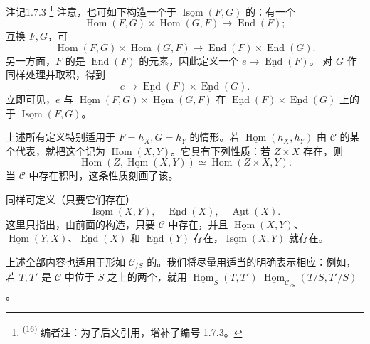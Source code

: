\begin{SGAresult}{注记}{1.7.3}
\footnote{\textsuperscript{(16)} 编者注：为了后文引用，增补了编号 1.7.3。}
注意，也可如下构造一个于 $\underline{\operatorname{Isom}}(F,G)$ 的：有一个
\[
\underline{\operatorname{Hom}}(F,G)\times\underline{\operatorname{Hom}}(G,F)\longrightarrow\underline{\operatorname{End}}(F);
\]
互换 $F,G$，可
\[
\underline{\operatorname{Hom}}(F,G)\times\underline{\operatorname{Hom}}(G,F)\longrightarrow\underline{\operatorname{End}}(F)\times\underline{\operatorname{End}}(G).
\]
另一方面，$F$ 的是 $\operatorname{End}(F)$ 的元素，因此定义一个 $e\to\underline{\operatorname{End}}(F)$。
对 $G$ 作同样处理并取积，得到
\[
e\longrightarrow\underline{\operatorname{End}}(F)\times\underline{\operatorname{End}}(G).
\]
立即可见，$e$ 与 $\underline{\operatorname{Hom}}(F,G)\times\underline{\operatorname{Hom}}(G,F)$ 在 $\underline{\operatorname{End}}(F)\times\underline{\operatorname{End}}(G)$ 上的于 $\underline{\operatorname{Isom}}(F,G)$。
\end{SGAresult}
上述所有定义特别适用于 $F=h_X,G=h_Y$ 的情形。若 $\underline{\operatorname{Hom}}(h_X,h_Y)$ 由 $\mathcal C$ 的某个代表，就把这个记为 $\underline{\operatorname{Hom}}(X,Y)$。它具有下列性质：若 $Z\times X$ 存在，则
\[
\operatorname{Hom}(Z,\underline{\operatorname{Hom}}(X,Y))\simeq\operatorname{Hom}(Z\times X,Y).
\]
当 $\mathcal C$ 中存在积时，这条性质刻画了该。

同样可定义（只要它们存在）
\[
\underline{\operatorname{Isom}}(X,Y),\quad\underline{\operatorname{End}}(X),\quad\underline{\operatorname{Aut}}(X).
\]
这里只指出，由前面的构造，只要 $\mathcal C$ 中存在，并且 $\underline{\operatorname{Hom}}(X,Y)$、$\underline{\operatorname{Hom}}(Y,X)$、$\underline{\operatorname{End}}(X)$ 和 $\underline{\operatorname{End}}(Y)$ 存在，$\underline{\operatorname{Isom}}(X,Y)$ 就存在。

上述全部内容也适用于形如 $\mathcal C_{/S}$ 的。我们将尽量用适当的明确表示相应：例如，若 $T,T'$ 是 $\mathcal C$ 中位于 $S$ 之上的两个，就用 $\underline{\operatorname{Hom}}_S(T,T')$  $\underline{\operatorname{Hom}}_{\mathcal C_{/S}}(T/S,T'/S)$。

